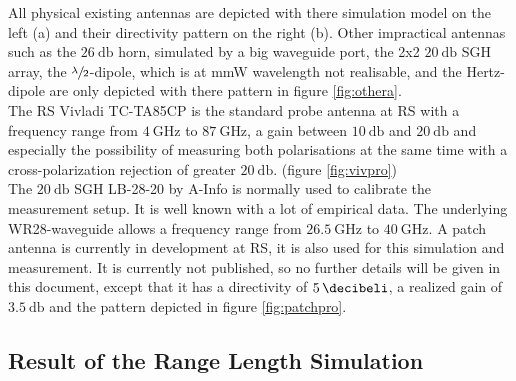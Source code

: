 All physical existing antennas are depicted with there simulation model on the left (a) and their directivity pattern on the right (b). Other impractical antennas such as the $\SI{26}{\decibel}$ horn, simulated by a big waveguide port, the 2x2 $\SI{20}{\decibel}$ \ac{SGH} array, the $\sfrac{\lambda}{2}$-dipole, which is at \ac{mmW} wavelength not realisable, and the Hertz-dipole are only depicted with there pattern in figure \ref{fig:othera}.\\
The \ac{RS} Vivladi TC-TA85CP is the standard probe antenna at \ac{RS} with a frequency range from $\SI{4}{\giga\hertz}$ to $\SI{87}{\giga\hertz}$, a gain between $\SI{10}{\decibel}$ and $\SI{20}{\decibel}$ and especially the possibility of measuring both polarisations at the same time with a cross-polarization rejection of greater $\SI{20}{\decibel}$. (figure \ref{fig:vivpro})\\
The $\SI{20}{\decibel}$ \ac{SGH} LB-28-20 by A-Info is normally used to calibrate the measurement setup. It is well known with a lot of empirical data. The underlying WR28-waveguide allows a frequency range from $\SI{26.5}{\giga\hertz}$ to $\SI{40}{\giga\hertz}$. A patch antenna is currently in development at \ac{RS}, it is also used for this simulation and measurement. It is currently not published, so  no further details will be given in this document, except that it has a directivity of $\SI{5}{\decibeli}$, a realized gain of $\SI{3.5}{\decibel}$ and the pattern depicted in figure \ref{fig:patchpro}. 

\subsection{Result of the Range Length Simulation}

